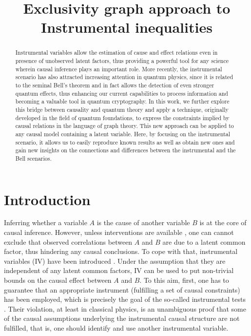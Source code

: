 \documentclass[letterpaper]{article}
\title{Exclusivity graph approach to Instrumental inequalities}
\author{} %
\begin{document}
\maketitle

\begin{abstract}
Instrumental variables allow the estimation of cause and effect relations even
in presence of unobserved latent factors, thus providing a powerful tool for any
science wherein causal inference plays an important role. More recently, the
instrumental scenario has also attracted increasing attention in quantum
physics, since it is related to the seminal Bell's theorem and in fact allows
the detection of even stronger quantum effects, thus enhancing our current
capabilities to process information and becoming a valuable tool in quantum
cryptography. In this work, we further explore this bridge between causality and
quantum theory and apply a technique, originally developed in the field of
quantum foundations, to express the constraints implied by causal relations in
the language of graph theory. This new approach can be applied to any causal
model containing a latent variable. Here, by focusing on the instrumental
scenario, it allows us to easily reproduce known results as well as obtain new
ones and gain new insights on the connections and differences between the
instrumental and the Bell scenarios. 
\end{abstract}

\section{Introduction}
Inferring  whether a variable $A$ is the cause of another variable $B$ is at the
core of causal inference. However, unless interventions are available
\cite{pearlbook}, one can cannot exclude that observed correlations between $A$
and $B$ are due to a latent common factor, thus hindering any causal
conclusions. To cope with that, instrumental variables (IV) have been introduced
\cite{pearl1995, bonet2001}. Under the assumption that they are independent of
any latent common factors, IV can be used to put non-trivial bounds on the
causal effect between $A$ and $B$. To this aim, first, one has to guarantee that
an appropriate instrument (fulfilling a set of causal constraints) has been
employed, which is precisely the goal of the so-called instrumental tests
\cite{pearl1995, bonet2001}. Their violation, at least in classical physics, is
an unambiguous proof that some of the causal assumptions underlying the
instrumental causal structure are not fulfilled, that is, one should identify
and use another instrumental variable.
\end{document}
